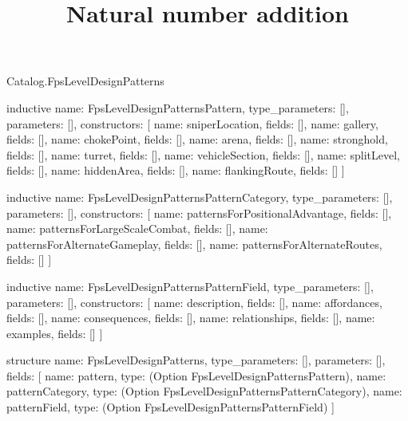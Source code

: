 \begin{lexlean}{Catalog.FpsLevelDesignPatterns}
\title{Natural number addition}
\begin{semanticmodule}
inductive{
  name: FpsLevelDesignPatternsPattern,
  type_parameters: [],
  parameters: [],
  constructors: [
    {name: sniperLocation, fields: []},
    {name: gallery, fields: []},
    {name: chokePoint, fields: []},
    {name: arena, fields: []},
    {name: stronghold, fields: []},
    {name: turret, fields: []},
    {name: vehicleSection, fields: []},
    {name: splitLevel, fields: []},
    {name: hiddenArea, fields: []},
    {name: flankingRoute, fields: []}
  ]
}

inductive{
  name: FpsLevelDesignPatternsPatternCategory,
  type_parameters: [],
  parameters: [],
  constructors: [
    {name: patternsForPositionalAdvantage, fields: []},
    {name: patternsForLargeScaleCombat, fields: []},
    {name: patternsForAlternateGameplay, fields: []},
    {name: patternsForAlternateRoutes, fields: []}
  ]
}

inductive{
  name: FpsLevelDesignPatternsPatternField,
  type_parameters: [],
  parameters: [],
  constructors: [
    {name: description, fields: []},
    {name: affordances, fields: []},
    {name: consequences, fields: []},
    {name: relationships, fields: []},
    {name: examples, fields: []}
  ]
}

structure{
  name: FpsLevelDesignPatterns,
  type_parameters: [],
  parameters: [],
  fields: [
    {name: pattern, type: (Option FpsLevelDesignPatternsPattern)},
    {name: patternCategory, type: (Option FpsLevelDesignPatternsPatternCategory)},
    {name: patternField, type: (Option FpsLevelDesignPatternsPatternField)}
  ]
}
\end{semanticmodule}
\end{lexlean}
